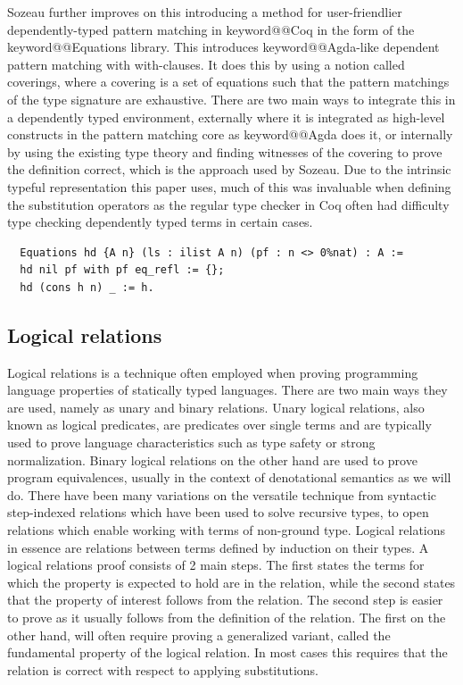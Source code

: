 \documentclass[11pt, final]{article}
\makeatletter
\def\<#1>{\csname keyword@@#1\endcsname}
\makeatother
\begin{document}
Sozeau further improves on this introducing a method for user-friendlier dependently-typed pattern matching in \<Coq> in the form of the \<Equations> library\cite{Sozeau2010}\cite{Sozeau2019}.
This introduces \<Agda>-like dependent pattern matching with with-clauses.
It does this by using a notion called coverings, where a covering is a set of equations such that the pattern matchings of the type signature are exhaustive.
There are two main ways to integrate this in a dependently typed environment, externally where it is integrated as high-level constructs in the pattern matching core as \<Agda> does it, or internally by using the existing type theory and finding witnesses of the covering to prove the definition correct, which is the approach used by Sozeau.
Due to the intrinsic typeful representation this paper uses, much of this was invaluable when defining the substitution operators as the regular type checker in Coq often had difficulty type checking dependently typed terms in certain cases.

\begin{listing}
  \begin{verbatim}
  Equations hd {A n} (ls : ilist A n) (pf : n <> 0%nat) : A :=
  hd nil pf with pf eq_refl := {};
  hd (cons h n) _ := h.
  \end{verbatim}
  \caption{Definition of hd using \<Equations>}
  \label{lst:dt_ilist_hd_equations}
\end{listing}


\subsection{Logical relations}

Logical relations is a technique often employed when proving programming language properties of statically typed languages\cite{skorstengaard2019introduction}. There are two main ways they are used, namely as unary and binary relations.
Unary logical relations, also known as logical predicates, are predicates over single terms and are typically used to prove language characteristics such as type safety or strong normalization.
Binary logical relations on the other hand are used to prove program equivalences, usually in the context of denotational semantics as we will do.
There have been many variations on the versatile technique from syntactic step-indexed relations which have been used to solve recursive types\cite{Ahmed2006}, to open relations which enable working with terms of non-ground type\cite{barthe2020versatility}\cite{huot2020correctness}.
Logical relations in essence are relations between terms defined by induction on their types.
A logical relations proof consists of 2 main steps.
The first states the terms for which the property is expected to hold are in the relation, while the second states that the property of interest follows from the relation.
The second step is easier to prove as it usually follows from the definition of the relation. The first on the other hand, will often require proving a generalized variant, called the fundamental property of the logical relation.
In most cases this requires that the relation is correct with respect to applying substitutions.
\end{document}

